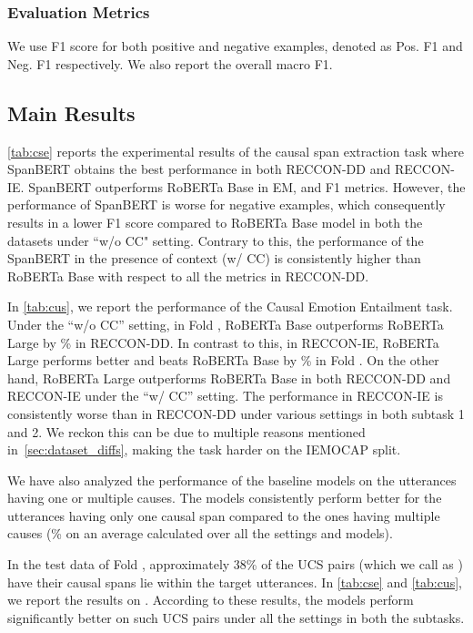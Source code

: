 \documentclass[11pt,a4paper]{article}
\theoremstyle{definition}
\newcommand\RECCONDADD{RECCON-DD}
\newcommand\RECCONDAIE{RECCON-IE}
\begin{document}
\subsubsection{Evaluation Metrics}
We use F1 score for both positive and negative examples, denoted as Pos. F1 and Neg. F1 respectively. We also report the overall macro F1.

\subsection{Main Results}
\label{sec:results}
\cref{tab:cse} reports the experimental results of the causal span extraction task where SpanBERT obtains the best performance in both \RECCONDADD{} and \RECCONDAIE{}. SpanBERT outperforms RoBERTa Base in EM, and F1 metrics. However, the performance of SpanBERT is worse for negative examples, which consequently results in a lower F1 score compared to RoBERTa Base model in both the datasets under ``w/o CC" setting. Contrary to this, the performance of the SpanBERT in the presence of context (w/ CC) is consistently higher than RoBERTa Base with respect to all the metrics in \RECCONDADD{}.


In \cref{tab:cus}, we report the performance of the Causal Emotion Entailment task. Under the ``w/o CC'' setting, in Fold , RoBERTa Base outperforms RoBERTa Large by \% in \RECCONDADD{}. In contrast to this, in \RECCONDAIE{}, RoBERTa Large performs better and beats RoBERTa Base by \% in Fold . On the other hand, RoBERTa Large outperforms RoBERTa Base in both \RECCONDADD{} and \RECCONDAIE{} under the ``w/ CC'' setting. The performance in \RECCONDAIE{} is consistently worse than in \RECCONDADD{} under various settings in both subtask 1 and 2. We reckon this can be due to multiple reasons mentioned in~\cref{sec:dataset_diffs}, making the task harder on the IEMOCAP split.



We have also analyzed the performance of the baseline models on the utterances having one or multiple causes. The models consistently perform better for the utterances having only one causal span compared to the ones having multiple causes (\% on an average calculated over all the settings and models).

In the test data of Fold , approximately 38\% of the UCS pairs (which we call as  ) have their causal spans lie within the target utterances. In \cref{tab:cse} and \ref{tab:cus}, we report the results on . According to these results, the models perform significantly better on such UCS pairs under all the settings in both the subtasks. 
\end{document}
